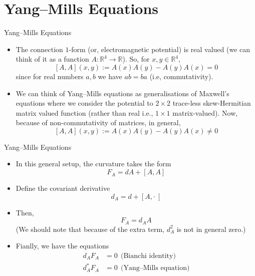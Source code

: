 \documentclass{beamer}
\theoremstyle{definition}
\begin{document}
	\section{Yang--Mills Equations}
    \begin{frame}{Yang--Mills Equations}{}
		\begin{itemize}
            \item<1-> {The connection $1$-form (or, electromagnetic potential) is real valued (we can think of it as a function $A : \mathbb{R}^4 \to \mathbb{R}$). So, for $x, y \in \mathbb{R}^4$,
            $$[A, A](x, y) := A(x)A(y) - A(y)A(x) = 0$$
            since for real numbers $a, b$ we have $ab = ba$ (i.e, commutativity).}
            \item<2-> {We can think of Yang--Mills equations as generalisations of Maxwell's equations where we consider the potential to $2 \times 2$ trace-less skew-Hermitian matrix valued function (rather than real i.e., $1 \times 1$ matrix-valued). Now, because of non-commutativity of matrices, in general,
            $$[A, A](x, y) := A(x)A(y) - A(y)A(x) \neq 0$$}
        \end{itemize}
	\end{frame}
	\begin{frame}{Yang--Mills Equations}{}
		\begin{itemize}
            \item<1-> {In this general setup, the curvature takes the form
            $$F_A = dA + [A,A]$$}
            \item<2-> {Define the covariant derivative
            $$d_A = d + [A, \cdot\ ]$$}
            \item<3-> {Then, $$F_A = d_AA$$
            (We should note that because of the extra term, $d_A^2$ is not in general zero.)}
            \item<4-> {Fianlly, we have the equations
            \begin{align*}
                d_AF_A &= 0\ \ \text{(Bianchi identity)}\\
                d_A^*F_A &= 0\ \ \text{(Yang--Mills equation)}
            \end{align*}}
        \end{itemize}
	\end{frame}
\end{document}
